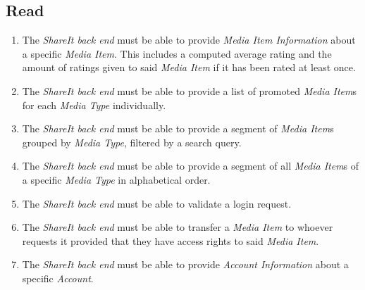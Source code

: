 

% 

\noindent

\subsection{Read}
\begin{enumerate}[label=FR-\twodigits*, resume]

\item The \textit{ShareIt back end} must be able to provide \textit{Media Item Information} about a specific \textit{Media Item}. This includes a computed average rating and the amount of ratings given to said \textit{Media Item} if it has been rated at least once.

\item The \textit{ShareIt back end} must be able to provide a list of promoted \textit{Media Item}s for each \textit{Media Type} individually.

\item The \textit{ShareIt back end} must be able to provide a segment of \textit{Media Item}s grouped by \textit{Media Type}, filtered by a search query.

\item The \textit{ShareIt back end} must be able to provide a segment of all \textit{Media Item}s of a specific \textit{Media Type} in alphabetical order.

\item The \textit{ShareIt back end} must be able to validate a login request.

\item The \textit{ShareIt back end} must be able to transfer a \textit{Media Item} to whoever requests it provided that they have access rights to said \textit{Media Item}.

\item The \textit{ShareIt back end} must be able to provide \textit{Account Information} about a specific \textit{Account}.

\end{enumerate}
